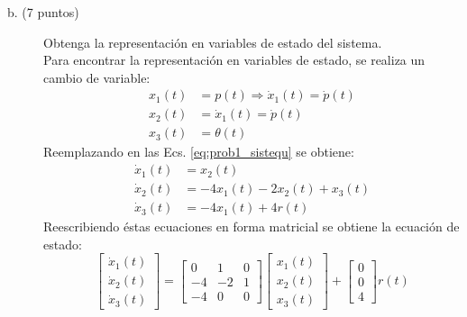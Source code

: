 \documentclass[11pt, spanish]{article}
\begin{document}
\begin{description}
\begin{description}
				\item [b. (7 puntos)] Obtenga la representación en variables de estado del sistema.\\
				Para encontrar la representación en variables de estado, se realiza un cambio de variable:
				\begin{align*}
					x_1(t) &= p(t) \Rightarrow \dot{x}_1(t) = \dot{p}(t)\\
					x_2(t) &= \dot{x}_1(t) = \dot{p}(t)\\
					x_3(t) &= \theta(t)
				\end{align*}
				Reemplazando en las Ecs. \ref{eq:prob1_sistequ} se obtiene:
				\begin{align*}
					\dot{x}_1(t) &= x_2(t)\\
					\dot{x}_2(t) &= -4x_1(t) -2x_2(t) + x_3(t)\\
					\dot{x}_3(t) &= -4x_1(t) + 4r(t)
				\end{align*}
				Reescribiendo éstas ecuaciones en forma matricial se obtiene la ecuación de estado:
				\begin{equation*}
					\begin{bmatrix}
						\dot{x}_1(t)\\ \dot{x}_2(t)\\ \dot{x}_3(t) 
					\end{bmatrix} = 
					\begin{bmatrix}
						 0 &  1 & 0\\
						-4 & -2 & 1\\
						-4 &  0 & 0
					\end{bmatrix}
					\begin{bmatrix}
						x_1(t)\\ x_2(t)\\ x_3(t) 
					\end{bmatrix} +
					\begin{bmatrix}
						0 \\ 0 \\ 4
					\end{bmatrix} r(t)
				\end{equation*}
			\end{description}
			

\end{description}
\end{document}

